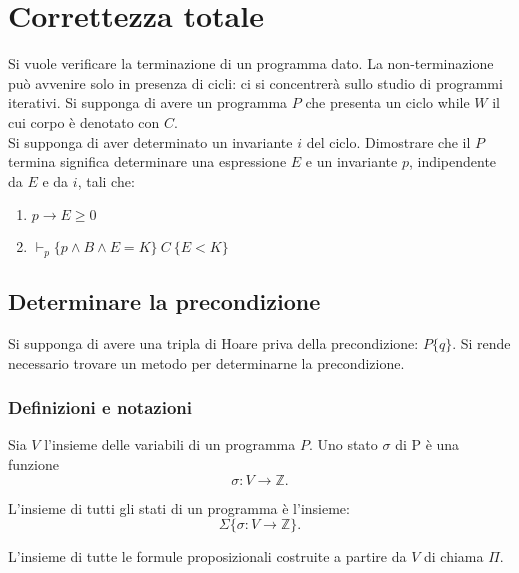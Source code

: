 \documentclass[11pt,a4paper]{article}
\begin{document}
\begin{prooftree}
\end{prooftree}

\section{Correttezza totale}
Si vuole verificare la terminazione di un programma dato. La non-terminazione pu\`o avvenire solo in presenza di cicli: ci si concentrer\`a sullo studio di programmi iterativi.
Si supponga di avere un programma $P$ che presenta un ciclo while $W$ il cui corpo \`e denotato con $C$. \\
Si supponga di aver determinato un invariante $i$ del ciclo. Dimostrare che il $P$ termina significa determinare una espressione $E$ e un invariante $p$, indipendente da $E$ e da $i$, tali che:
\begin{enumerate}
	\item $ p \rightarrow E \geq 0$
	\item $ \vdash_p \{ p \land B \land E=K  \}\ C\ \{E < K\}   $
\end{enumerate}

\subsection{Determinare la precondizione}
Si supponga di avere una tripla di Hoare priva della precondizione: $P\{q\}$. Si rende necessario trovare un metodo per determinarne la precondizione.

\subsubsection{Definizioni e notazioni}
\begin{deff}
	Sia $V$ l'insieme delle variabili di un programma $P$. Uno stato $\sigma$ di P \`e una funzione $$\sigma: V \rightarrow \mathbb{Z}.$$
\end{deff}

\begin{deff}
	L'insieme di tutti gli stati di un programma \`e l'insieme: $$\Sigma \{\sigma:V\rightarrow \mathbb{Z}\}.$$
\end{deff}

\begin{deff}
	L'insieme di tutte le formule proposizionali costruite a partire da $V$ di chiama $\Pi$.
\end{deff}
\end{document}
